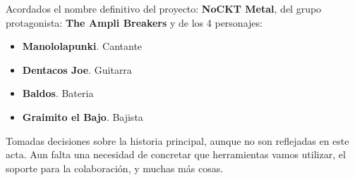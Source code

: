\documentclass[a4paper,10pt]{article}
\begin{document}
\noindent Acordados el nombre definitivo del proyecto: \textbf{NoCKT
  Metal}, del grupo protagonista: \textbf{The Ampli Breakers} y de los
4 personajes:
\begin{itemize}
\item \textbf{Manololapunki}. Cantante
\item \textbf{Dentacos Joe}. Guitarra
\item \textbf{Baldos}. Bateria
\item \textbf{Graimito el Bajo}. Bajista
\end{itemize}

\noindent Tomadas decisiones sobre la historia principal, aunque no
son reflejadas en este acta. Aun falta una necesidad de concretar que
herramientas vamos utilizar, el soporte para la colaboración, y muchas
más cosas.
\end{document}
